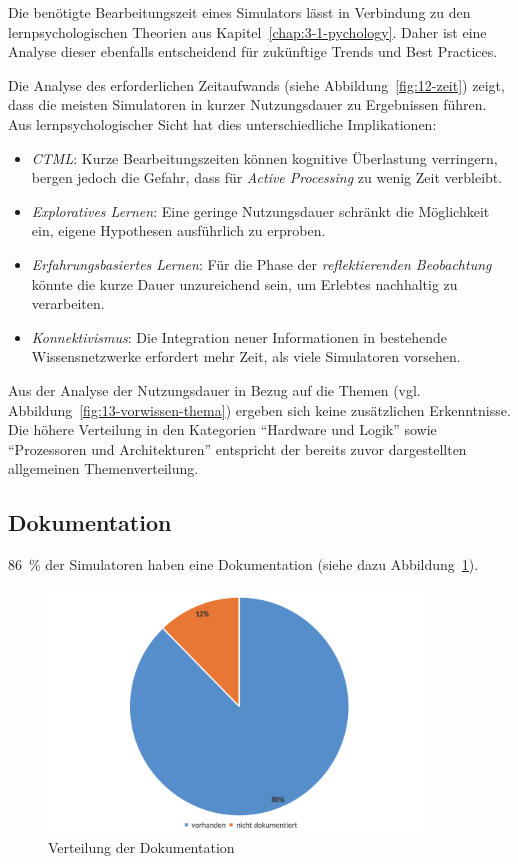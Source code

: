 Die benötigte Bearbeitungszeit eines Simulators lässt in Verbindung zu den lernpsychologischen Theorien aus Kapitel~\ref{chap:3-1-pychology}. Daher ist eine Analyse dieser ebenfalls entscheidend für zukünftige Trends und Best Practices.

Die Analyse des erforderlichen Zeitaufwands (siehe Abbildung~\ref{fig:12-zeit}) zeigt, dass die meisten Simulatoren in kurzer Nutzungsdauer zu Ergebnissen führen. Aus lernpsychologischer Sicht hat dies unterschiedliche Implikationen:

\begin{itemize}
    \item \textit{\ac{CTML}}: Kurze Bearbeitungszeiten können kognitive Überlastung verringern, bergen jedoch die Gefahr, dass für \textit{Active Processing} zu wenig Zeit verbleibt.
    \item \textit{Exploratives Lernen}: Eine geringe Nutzungsdauer schränkt die Möglichkeit ein, eigene Hypothesen ausführlich zu erproben.
    \item \textit{Erfahrungsbasiertes Lernen}: Für die Phase der \textit{reflektierenden Beobachtung} könnte die kurze Dauer unzureichend sein, um Erlebtes nachhaltig zu verarbeiten.
    \item \textit{Konnektivismus}: Die Integration neuer Informationen in bestehende Wissensnetzwerke erfordert mehr Zeit, als viele Simulatoren vorsehen.
\end{itemize}

Aus der Analyse der Nutzungsdauer in Bezug auf die Themen (vgl. Abbildung~\ref{fig:13-vorwissen-thema}) ergeben sich keine zusätzlichen Erkenntnisse. Die höhere Verteilung in den Kategorien \enquote{Hardware und Logik} sowie \enquote{Prozessoren und Architekturen} entspricht der bereits zuvor dargestellten allgemeinen Themenverteilung.

\subsection{Dokumentation}
86~\% der Simulatoren haben eine Dokumentation (siehe dazu Abbildung~\ref{fig:14-dokumentation}).

\begin{figure}[!htbp]
    \centering
    \includegraphics[width=0.90\textwidth]{graphics_sim/14-dokumentation.png}
    \caption{Verteilung der Dokumentation}
    \label{fig:14-dokumentation}
\end{figure}

